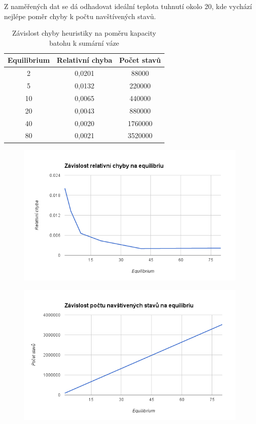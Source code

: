 \documentclass[10pt,a4paper]{article}
\begin{document}
Z naměřených dat se dá odhadovat ideální teplota tuhnutí okolo 20, kde vychází nejlépe poměr chyby k počtu navštívených stavů.

\begin{table}[H]
\centering
  \begin{tabular}{ |c|c|c|}
  \hline
  Equilibrium & Relativní chyba & Počet stavů \\
  \hline
  2  & 0,0201 & 88000 \\
  5  & 0,0132 & 220000 \\
  10 & 0,0065 & 440000 \\ 
  20 & 0,0043 & 880000 \\
  40 & 0,0020 & 1760000 \\
  80 & 0,0021 & 3520000 \\    
  \hline
  \end{tabular}
  \caption{Závislost chyby heuristiky na poměru kapacity batohu k sumární váze}
\end{table}

\begin{figure}[H]\centering
 \includegraphics[width=0.99\textwidth]{7}
\end{figure}

\begin{figure}[H]\centering
 \includegraphics[width=0.99\textwidth]{8}
\end{figure}
\end{document}
